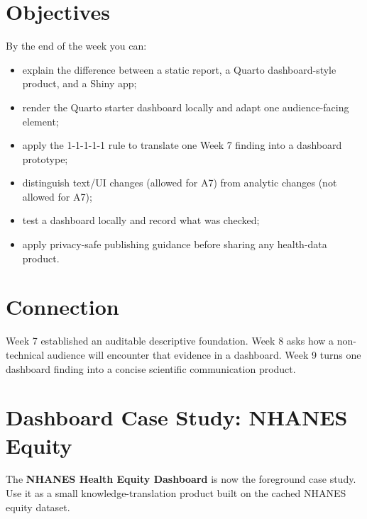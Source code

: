 \documentclass[
  letterpaper,
  DIV=11,
  numbers=noendperiod,
  oneside]{scrreprt}
\providecommand{\tightlist}{%
  \setlength{\itemsep}{0pt}\setlength{\parskip}{0pt}}
\begin{document}
\section*{Objectives}\label{objectives-2}


By the end of the week you can:

\begin{itemize}
\tightlist
\item
  explain the difference between a static report, a Quarto
  dashboard-style product, and a Shiny app;
\item
  render the Quarto starter dashboard locally and adapt one
  audience-facing element;
\item
  apply the 1-1-1-1-1 rule to translate one Week 7 finding into a
  dashboard prototype;
\item
  distinguish text/UI changes (allowed for A7) from analytic changes
  (not allowed for A7);
\item
  test a dashboard locally and record what was checked;
\item
  apply privacy-safe publishing guidance before sharing any health-data
  product.
\end{itemize}

\section*{Connection}\label{connection-7}


Week 7 established an auditable descriptive foundation. Week 8 asks how
a non-technical audience will encounter that evidence in a dashboard.
Week 9 turns one dashboard finding into a concise scientific
communication product.

\section*{Dashboard Case Study: NHANES
Equity}\label{dashboard-case-study-nhanes-equity}


The \textbf{NHANES Health Equity Dashboard} is now the foreground case
study. Use it as a small knowledge-translation product built on the
cached NHANES equity dataset.
\end{document}
